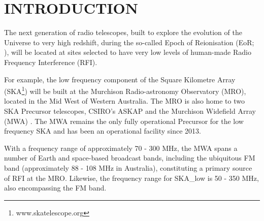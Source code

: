 \begin{abstract}
We present the first survey of radio frequency interference (RFI) at the future site of the low frequency Square Kilometre Array (SKA), the Murchison Radio-astronomy Observatory (MRO), that both temporally and spatially resolves the RFI.  The survey is conducted in a 1 MHz frequency range within the FM band, designed to encompass the closest and strongest FM transmitters to the MRO (located in Geraldton, approximately 300 km distant).  Conducted over approximately three days using the second iteration of the Engineering Development Array in an all-sky imaging mode, we find a range of RFI signals.  We are able to categorise the signals into: those received directly from the transmitters, from their horizon locations; reflections from aircraft (occupying approximately 13\% of the observation duration); reflections from objects in Earth orbit; and reflections from meteor ionisation trails.  In total we analyse 33,994 images at 7.92 s time resolution in both polarisations with angular resolution of approximately 3.5$^{\circ}$, detecting approximately forty thousand RFI events.  This detailed breakdown of RFI in the MRO environment will enable future detailed analyses of the likely impacts of RFI on key science at low radio frequencies with the SKA.
\end{abstract}

\section{INTRODUCTION }
\label{sec:int}

The next generation of radio telescopes, built to explore the evolution of the Universe to very high redshift, during the so-called Epoch of Reionisation (EoR; \citet{2006PhR...433..181F}), will be located at sites selected to have very low levels of human-made Radio Frequency Interference (RFI).

For example, the low frequency component of the Square Kilometre Array (SKA\footnote{www.skatelescope.org}) will be built at the Murchison Radio-astronomy Observatory (MRO), located in the Mid West of Western Australia.  The MRO is also home to two SKA Precursor telescopes, CSIRO's ASKAP \citep{2008ExA....22..151J} and the Murchison Widefield Array (MWA) \citep{2018PASA...35...33W,2013PASA...30....7T}.  The MWA remains the only fully operational Precursor for the low frequency SKA and has been an operational facility since 2013.

With a frequency range of approximately 70 - 300 MHz, the MWA spans a number of Earth and space-based broadcast bands, including the ubiquitous FM band (approximately 88 - 108 MHz in Australia), constituting a primary source of RFI at the MRO.  Likewise, the frequency range for SKA\_low is 50 - 350 MHz, also encompassing the FM band.

